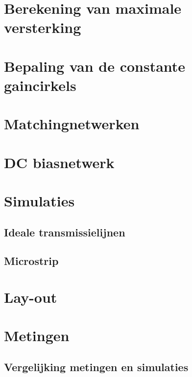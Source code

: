   

\section{Berekening van maximale versterking}
  
  \section{Bepaling van de constante gaincirkels}

\section{Matchingnetwerken}

\section{DC biasnetwerk}

\section{Simulaties}
  \subsection{Ideale transmissielijnen}
  \subsection{Microstrip}

\section{Lay-out}

\section{Metingen}
\subsection{Vergelijking metingen en simulaties}




